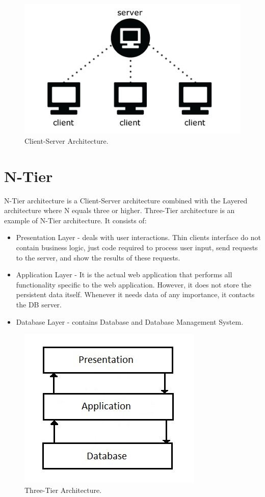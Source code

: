 \documentclass{article}
\begin{document}
\begin{figure}[h]
\centering
\includegraphics[scale=1]{client-server.png}
\caption{Client-Server Architecture.}
\label{fig_cs}
\end{figure}

\newpage

\section{N-Tier}
N-Tier architecture is a Client-Server architecture combined with the Layered architecture where N equals three or higher. Three-Tier architecture is an example of N-Tier architecture. It consists of:

\begin{itemize}

\item Presentation Layer - deals with user interactions. Thin clients interface do not contain business logic, just code required to process user input, send requests to the server, and show the results of these requests. 
\item Application Layer - It is the actual web application that performs all functionality specific to the web application. However, it does not store the persistent data itself. Whenever it needs data of any importance, it contacts the DB server. 
\item Database Layer - contains Database and Database Management System. 

\end{itemize}


\begin{figure}[h]
\centering
\includegraphics[scale=1]{3t.jpg}
\caption{Three-Tier Architecture.}
\label{fig_3t}
\end{figure}
\end{document}
